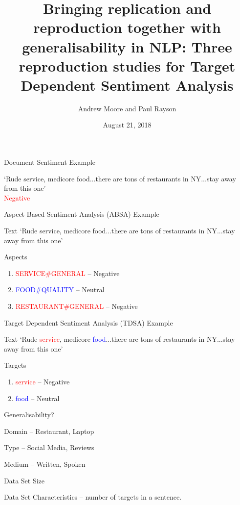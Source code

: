 \documentclass[10pt]{beamer}
\title{Bringing replication and reproduction together with generalisability in
NLP: Three reproduction studies for Target Dependent Sentiment
Analysis}
\author{Andrew Moore and Paul Rayson}
\date{August 21, 2018}
\institute{School of Computing and Communications, Lancaster University, Lancaster, UK}
\newenvironment{packed_enum}{
\begin{enumerate}
  \setlength{\itemsep}{20pt}
  \setlength{\parskip}{0pt}
  \setlength{\parsep}{0pt}
}{\end{enumerate}}
\begin{document}
\maketitle

\begin{frame}{Document Sentiment Example}
\centering
    
    `Rude service, medicore food...there are tons of restaurants in NY...stay away from this one'
    \citep{pontiki_2015}\\
    \textcolor{red}{Negative}

\end{frame}

\begin{frame}{Aspect Based Sentiment Analysis (ABSA) Example}
\centering
\begin{block}{Text}
    `Rude service, medicore food...there are tons of restaurants in NY...stay away from this one'
    \citep{pontiki_2015}
\end{block}
\begin{block}{Aspects}
    \begin{enumerate}
        \item \textcolor{red}{SERVICE\#GENERAL} -- Negative
        \item \textcolor{blue}{FOOD\#QUALITY} -- Neutral
        \item \textcolor{red}{RESTAURANT\#GENERAL} -- Negative
    \end{enumerate}
\end{block}
\end{frame}

\begin{frame}{Target Dependent Sentiment Analysis (TDSA) Example}
\centering
\begin{block}{Text}
    `Rude \textcolor{red}{service}, medicore \textcolor{blue}{food}...there are tons of restaurants in NY...stay away from this one'
    \citep{pontiki_2015}
\end{block}
\begin{block}{Targets}
    \begin{enumerate}
        \item \textcolor{red}{service} -- Negative
        \item \textcolor{blue}{food} -- Neutral
    \end{enumerate}
\end{block}
\end{frame}


\begin{frame}{Generalisability?}

\begin{packed_enum}
    \item Domain -- Restaurant, Laptop
    \item Type -- Social Media, Reviews
    \item Medium -- Written, Spoken
    \item Data Set Size
    \item Data Set Characteristics -- number of targets in a sentence.
\end{packed_enum}

\end{frame}
\end{document}
